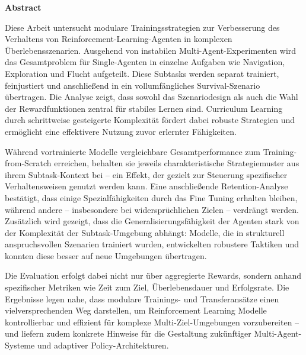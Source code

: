 \vspace*{1cm}
\begin{center}
    \textbf{Abstract}
\end{center}

\vspace*{1cm}
Diese Arbeit untersucht modulare Trainingsstrategien zur Verbesserung des Verhaltens von Reinforcement-Learning-Agenten in komplexen Überlebensszenarien. Ausgehend von instabilen Multi-Agent-Experimenten wird das Gesamtproblem für Single-Agenten in einzelne Aufgaben wie Navigation, Exploration und Flucht aufgeteilt. Diese Subtasks werden separat trainiert, feinjustiert und anschließend in ein vollumfängliches Survival-Szenario übertragen. Die Analyse zeigt, dass sowohl das Szenariodesign als auch die Wahl der Rewardfunktionen zentral für stabiles Lernen sind. Curriculum Learning durch schrittweise gesteigerte Komplexität fördert dabei robuste Strategien und ermöglicht eine effektivere Nutzung zuvor erlernter Fähigkeiten.

Während vortrainierte Modelle vergleichbare Gesamtperformance zum Training-from-Scratch erreichen, behalten sie jeweils charakteristische Strategiemuster aus ihrem Subtask-Kontext bei – ein Effekt, der gezielt zur Steuerung spezifischer Verhaltensweisen genutzt werden kann. Eine anschließende Retention-Analyse bestätigt, dass einige Spezialfähigkeiten durch das Fine Tuning erhalten bleiben, während andere – insbesondere bei widersprüchlichen Zielen – verdrängt werden. Zusätzlich wird gezeigt, dass die Generalisierungsfähigkeit der Agenten stark von der Komplexität der Subtask-Umgebung abhängt: Modelle, die in strukturell anspruchsvollen Szenarien trainiert wurden, entwickelten robustere Taktiken und konnten diese besser auf neue Umgebungen übertragen.

Die Evaluation erfolgt dabei nicht nur über aggregierte Rewards, sondern anhand spezifischer Metriken wie Zeit zum Ziel, Überlebensdauer und Erfolgsrate. Die Ergebnisse legen nahe, dass modulare Trainings- und Transferansätze einen vielversprechenden Weg darstellen, um Reinforcement Learning Modelle kontrollierbar und effizient für komplexe Multi-Ziel-Umgebungen vorzubereiten – und liefern zudem konkrete Hinweise für die Gestaltung zukünftiger Multi-Agent-Systeme und adaptiver Policy-Architekturen.

 

\noindent 
